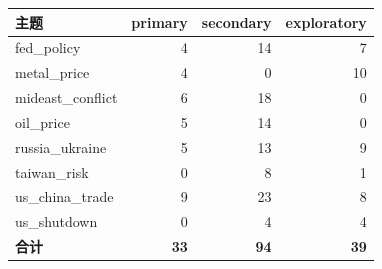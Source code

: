 \begin{tabular}{lrrr}
\toprule
主题 & primary & secondary & exploratory \\
\midrule
fed\_policy & 4 & 14 & 7 \\
metal\_price & 4 & 0 & 10 \\
mideast\_conflict & 6 & 18 & 0 \\
oil\_price & 5 & 14 & 0 \\
russia\_ukraine & 5 & 13 & 9 \\
taiwan\_risk & 0 & 8 & 1 \\
us\_china\_trade & 9 & 23 & 8 \\
us\_shutdown & 0 & 4 & 4 \\
\midrule
\textbf{合计} & \textbf{33} & \textbf{94} & \textbf{39} \\
\bottomrule
\end{tabular}
